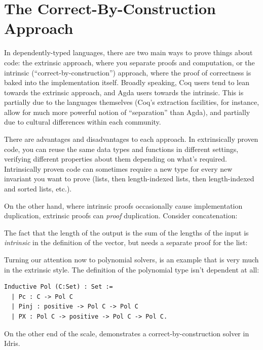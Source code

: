 \documentclass[draft, twocolumn]{article}
\theoremstyle{definition}
\theoremstyle{definition}
\begin{document}
\section{The Correct-By-Construction Approach}
In dependently-typed languages, there are two main ways to prove things about
code: the extrinsic approach, where you separate proofs and computation, or the
intrinsic (``correct-by-construction'') approach, where the proof of correctness
is baked into the implementation itself. Broadly speaking, Coq users tend to
lean towards the extrinsic approach, and Agda users towards the intrinsic. This
is partially due to the languages themselves (Coq's extraction facilities, for
instance, allow for much more powerful notion of ``separation'' than Agda), and
partially due to cultural differences within each community.

There are advantages and disadvantages to each approach. In extrinsically proven
code, you can reuse the same data types and functions in different settings,
verifying different properties about them depending on what's required.
Intrinsically proven code can sometimes require a new type for every new
invariant you want to prove (lists, then length-indexed lists, then
length-indexed and sorted lists, etc.).

On the other hand, where intrinsic proofs occasionally cause implementation
duplication, extrinsic proofs can \emph{proof} duplication. Consider
concatenation:

The fact that the length of the output is the sum of the lengths of the input is
\emph{intrinsic} in the definition of the vector, but needs a separate proof for
the list:

Turning our attention now to polynomial solvers, \cite{gregoire_proving_2005} is
an example that is very much in the extrinsic style. The definition of the
polynomial type isn't dependent at all:
\begin{small}
\begin{verbatim}
Inductive Pol (C:Set) : Set :=
  | Pc : C -> Pol C
  | Pinj : positive -> Pol C -> Pol C
  | PX : Pol C -> positive -> Pol C -> Pol C.
\end{verbatim}
\end{small}

On the other end of the scale, \cite{geuvers_automatically_2017} demonstrates a
correct-by-construction solver in Idris.
\end{document}
